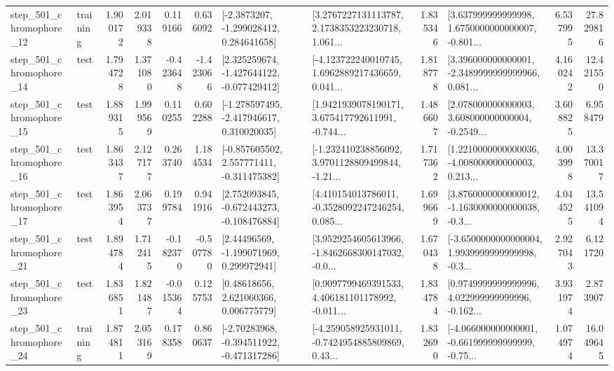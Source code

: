 \begin{tabular}{llrrrrllrlrr}
  step\_501\_chromophore\_12 &  training &      1.900172 &    2.019338 &      0.119166 &  0.636092 &     [-2.3873207, -1.299028412, 0.284641658] &  [3.2767227131113787, 2.1738353223230718, 1.061... &       1.835346 &  [3.637999999999998, 1.6750000000000007, -0.801... &            6.537995 &         27.829816 \\
  step\_501\_chromophore\_14 &      test &      1.794728 &    1.371080 &     -0.423648 & -1.423066 &   [2.325259674, -1.427644122, -0.077429412] &  [-4.123722240010745, 1.6962889217436659, 0.041... &       1.818778 &  [3.396000000000001, -2.3489999999999966, 0.081... &            4.160242 &         12.421550 \\
  step\_501\_chromophore\_15 &      test &      1.889315 &    1.999569 &      0.110255 &  0.602288 &   [-1.278597495, -2.417946617, 0.310020035] &  [1.9421939078190171, 3.675417792611991, -0.744... &       1.486607 &  [2.078000000000003, 3.608000000000004, -0.2549... &            3.608825 &          6.958479 \\
  step\_501\_chromophore\_16 &      test &      1.863437 &    2.127177 &      0.263740 &  1.184534 &   [-0.857605502, 2.557771411, -0.311475382] &  [-1.232410238856092, 3.9701128809499844, -1.21... &       1.717362 &  [1.2210000000000036, -4.008000000000003, 0.213... &            4.003998 &         13.370017 \\
  step\_501\_chromophore\_17 &      test &      1.863954 &    2.063737 &      0.199784 &  0.941916 &   [2.752093845, -0.672443273, -0.108476884] &  [4.410154013786011, -0.3528092247246254, 0.085... &       1.699669 &  [3.8760000000000012, -1.1630000000000038, -0.3... &            4.044525 &         13.541094 \\
  step\_501\_chromophore\_21 &      test &      1.894784 &    1.712415 &     -0.182370 & -0.507780 &     [2.44496569, -1.199071969, 0.299972941] &  [3.9529254605613966, -1.8462668300147032, -0.0... &       1.670438 &  [-3.6500000000000004, 1.9939999999999998, -0.3... &            2.927043 &          6.121720 \\
  step\_501\_chromophore\_23 &      test &      1.836851 &    1.821487 &     -0.015364 &  0.125753 &      [0.48618656, 2.621060366, 0.006775779] &  [0.9097799469391533, 4.406181101178992, -0.011... &       1.834784 &  [0.9749999999999996, 4.022999999999996, -0.162... &            3.931974 &          2.873907 \\
  step\_501\_chromophore\_24 &  training &      1.874811 &    2.053169 &      0.178358 &  0.860637 &   [-2.70283968, -0.394511922, -0.471317286] &  [-4.259058925931011, -0.7424954885809869, 0.43... &       1.832690 &  [-4.066000000000001, -0.661999999999999, -0.75... &            1.074974 &         16.049645 \\

\end{tabular}
